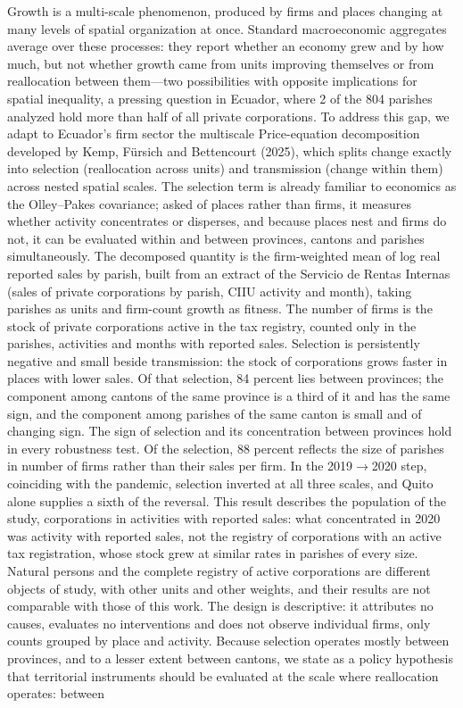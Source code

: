 \documentclass[12pt,a4paper]{article}
\newcommand{\dobleesp}{\setstretch{1.903}} %
\newcommand{\blank}{\par\vspace{13.8pt}}          %
\newcommand{\xii}{\fontsize{12pt}{13.8pt}\selectfont}
\newcommand{\caratula}[1]{\par\vspace{12pt}{\centering\bfseries\xii #1\par}\vspace{18pt}}
\begin{document}
\clearpage
\blank
\caratula{ABSTRACT}
\begingroup\dobleesp
\vspace{6pt}
Growth is a multi-scale phenomenon, produced by firms and places changing at many levels of spatial organization at once. Standard macroeconomic aggregates average over these processes: they report whether an economy grew and by how much, but not whether growth came from units improving themselves or from reallocation between them---two possibilities with opposite implications for spatial inequality, a pressing question in Ecuador, where 2 of the 804 parishes analyzed hold more than half of all private corporations. To address this gap, we adapt to Ecuador's firm sector the multiscale Price-equation decomposition developed by Kemp, Fürsich and Bettencourt (2025), which splits change exactly into selection (reallocation across units) and transmission (change within them) across nested spatial scales. The selection term is already familiar to economics as the Olley--Pakes covariance; asked of places rather than firms, it measures whether activity concentrates or disperses, and because places nest and firms do not, it can be evaluated within and between provinces, cantons and parishes simultaneously. The decomposed quantity is the firm-weighted mean of log real reported sales by parish, built from an extract of the Servicio de Rentas Internas (sales of private corporations by parish, CIIU activity and month), taking parishes as units and firm-count growth as fitness. The number of firms is the stock of private corporations active in the tax registry, counted only in the parishes, activities and months with reported sales. Selection is persistently negative and small beside transmission: the stock of corporations grows faster in places with lower sales. Of that selection, 84 percent lies between provinces; the component among cantons of the same province is a third of it and has the same sign, and the component among parishes of the same canton is small and of changing sign. The sign of selection and its concentration between provinces hold in every robustness test. Of the selection, 88 percent reflects the size of parishes in number of firms rather than their sales per firm. In the 2019$\to$2020 step, coinciding with the pandemic, selection inverted at all three scales, and Quito alone supplies a sixth of the reversal. This result describes the population of the study, corporations in activities with reported sales: what concentrated in 2020 was activity with reported sales, not the registry of corporations with an active tax registration, whose stock grew at similar rates in parishes of every size. Natural persons and the complete registry of active corporations are different objects of study, with other units and other weights, and their results are not comparable with those of this work. The design is descriptive: it attributes no causes, evaluates no interventions and does not observe individual firms, only counts grouped by place and activity. Because selection operates mostly between provinces, and to a lesser extent between cantons, we state as a policy hypothesis that territorial instruments should be evaluated at the scale where reallocation operates: between 
\end{document}
